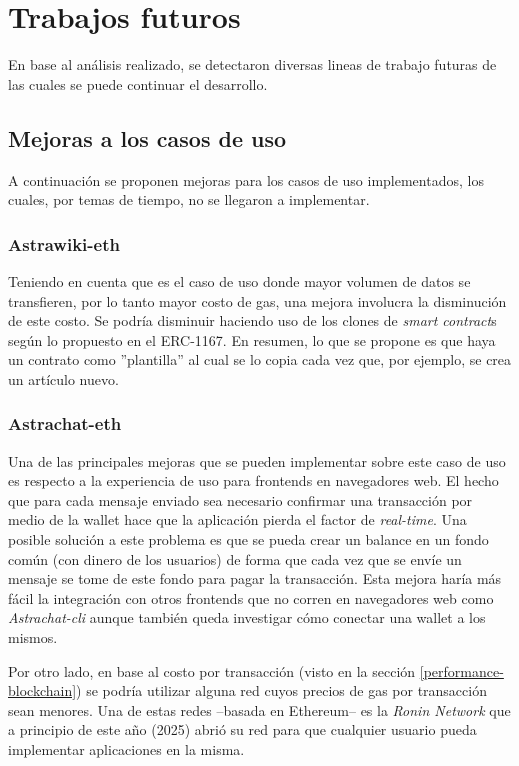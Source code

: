 \section{Trabajos futuros}

En base al análisis realizado, se detectaron diversas lineas de trabajo futuras de las cuales se puede continuar el desarrollo.

\subsection{Mejoras a los casos de uso}

A continuación se proponen mejoras para los casos de uso implementados, los cuales, por temas de tiempo, no se llegaron a implementar.

\subsubsection{Astrawiki-eth}

Teniendo en cuenta que es el caso de uso donde mayor volumen de datos se transfieren, por lo tanto mayor costo de gas, una mejora involucra la disminución de este costo. Se podría disminuir haciendo uso de los clones de \textit{smart contract}s según lo propuesto en el ERC-1167\cite{erc-1167}. En resumen, lo que se propone es que haya un contrato como ''plantilla'' al cual se lo copia cada vez que, por ejemplo, se crea un artículo nuevo.

\subsubsection{Astrachat-eth}

Una de las principales mejoras que se pueden implementar sobre este caso de uso es respecto a la experiencia de uso para frontends en navegadores web. El hecho que para cada mensaje enviado sea necesario confirmar una transacción por medio de la wallet hace que la aplicación pierda el factor de \textit{real-time}. Una posible solución a este problema es que se pueda crear un balance en un fondo común (con dinero de los usuarios) de forma que cada vez que se envíe un mensaje se tome de este fondo para pagar la transacción. Esta mejora haría más fácil la integración con otros frontends que no corren en navegadores web como \textit{Astrachat-cli} aunque también queda investigar cómo conectar una wallet a los mismos.

Por otro lado, en base al costo por transacción (visto en la sección \ref{performance-blockchain}) se podría utilizar alguna red cuyos precios de gas por transacción sean menores. Una de estas redes --basada en Ethereum-- es la \textit{Ronin Network}\cite{ronin-network}\cite{ronin-network-whitepaper} que a principio de este año (2025) abrió su red para que cualquier usuario pueda implementar aplicaciones en la misma.

